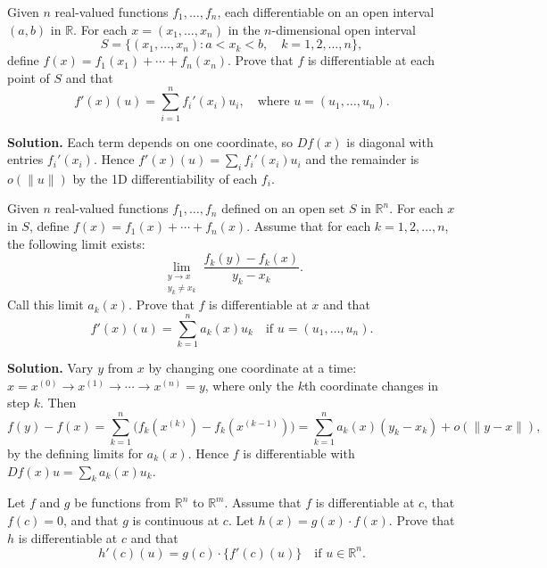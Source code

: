 \begin{problembox}
Given \( n \) real-valued functions \( f_1, \ldots, f_n \), each differentiable on an open interval \( (a, b) \) in \( \mathbb{R} \). For each \( x = (x_1, \ldots, x_n) \) in the \( n \)-dimensional open interval
\[S = \{(x_1, \ldots, x_n): a < x_k < b, \quad k = 1, 2, \ldots, n\},\]
define \( f(x) = f_1(x_1) + \cdots + f_n(x_n) \). Prove that \( f \) is differentiable at each point of \( S \) and that
\[f'(x)(u) = \sum_{i=1}^{n} f_i'(x_i)u_i, \quad \text{where } u = (u_1, \ldots, u_n).\]
\end{problembox}

\noindent\textbf{Solution.}
Each term depends on one coordinate, so $Df(x)$ is diagonal with entries $f_i'(x_i)$. Hence $f'(x)(u)=\sum_i f_i'(x_i)u_i$ and the remainder is $o(\|u\|)$ by the 1D differentiability of each $f_i$.

\begin{problembox}
Given \( n \) real-valued functions \( f_1, \ldots, f_n \) defined on an open set \( S \) in \( \mathbb{R}^n \). For each \( x \) in \( S \), define \( f(x) = f_1(x) + \cdots + f_n(x) \). Assume that for each \( k = 1, 2, \ldots, n \), the following limit exists:
\[\lim_{\substack{y \to x \\ y_k \neq x_k}} \frac{f_k(y) - f_k(x)}{y_k - x_k}.\]
Call this limit \( a_k(x) \). Prove that \( f \) is differentiable at \( x \) and that
\[f'(x)(u) = \sum_{k=1}^{n} a_k(x) u_k \quad \text{if } u = (u_1, \ldots, u_n).\]
\end{problembox}

\noindent\textbf{Solution.}
Vary $y$ from $x$ by changing one coordinate at a time: $x=x^{(0)}\to x^{(1)}\to\cdots\to x^{(n)}=y$, where only the $k$th coordinate changes in step $k$. Then
\[f(y)-f(x)=\sum_{k=1}^n\big(f_k(x^{(k)})-f_k(x^{(k-1)})\big)=\sum_{k=1}^n a_k(x)(y_k-x_k)+o(\|y-x\|),\]
by the defining limits for $a_k(x)$. Hence $f$ is differentiable with $Df(x)u=\sum_k a_k(x)u_k$.

\begin{problembox}
Let \( f \) and \( g \) be functions from \( \mathbb{R}^n \) to \( \mathbb{R}^m \). Assume that \( f \) is differentiable at \( c \), that \( f(c) = 0 \), and that \( g \) is continuous at \( c \). Let \( h(x) = g(x) \cdot f(x) \). Prove that \( h \) is differentiable at \( c \) and that
\[h'(c)(u) = g(c) \cdot \{f'(c)(u)\} \quad \text{if } u \in \mathbb{R}^n.\]
\end{problembox}


